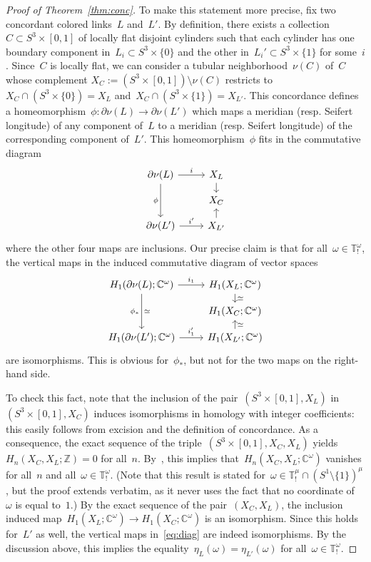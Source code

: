 \documentclass{amsart}
\newcommand{\Z}{\mathbb{Z}}
\newcommand{\C}{\mathbb{C}}
\newcommand{\T}{\mathbb{T}}
\theoremstyle{definition}
\theoremstyle{remark}
\begin{document}
\begin{proof}[Proof of Theorem~\ref{thm:conc}]
	To make this statement more precise, fix two concordant colored links~$L$ and~$L'$. By definition, there exists a collection~$C\subset S^3\times [0,1]$ of locally flat disjoint cylinders such that each cylinder has one boundary component in~$L_i\subset S^3\times\{0\}$ and the other in~$L_i'\subset S^3\times \{1\}$ for some~$i$. Since~$C$ is locally flat, we can consider a tubular neighborhood~$\nu(C)$ of~$C$ whose complement $X_C:=(S^3\times [0,1])\setminus\nu(C)$ restricts to~$X_C\cap(S^3\times\{0\})=X_L$ and~$X_C\cap(S^3\times\{1\})=X_{L'}$.
	This concordance defines a homeomorphism~$\phi\colon\partial\nu(L)\to\partial\nu(L')$ which maps a meridian
	(resp. Seifert longitude) of any component of~$L$ to a meridian
	(resp. Seifert longitude) of the corresponding component of~$L'$. This homeomorphism~$\phi$ fits in the commutative diagram
	\[
	\begin{tikzcd}[row sep=small]
		\partial\nu(L)\ar[r,"i"] \ar[dd,"\phi" '] & X_L  \ar[d]\\
		& X_C\\
		\partial\nu(L')\ar[r,"i'"] & X_{L'}  \ar[u]
	\end{tikzcd}
	\]
	where the other four maps are inclusions. Our precise claim is that for all~$\omega\in\T^\omega_!$,
	the vertical maps in the induced commutative diagram of vector spaces
	\begin{equation}
		\label{eq:diag}
		\begin{tikzcd}[row sep=small]
			H_1(\partial\nu(L);\C^\omega)\ar[r,"i_1"] \ar[dd,"\phi_*" ',"\simeq"] & H_1(X_L;\C^\omega)  \ar[d,"\simeq"]\\
			& H_1(X_C;\C^\omega)\\
			H_1(\partial\nu(L');\C^\omega)\ar[r,"i_1'"] & H_1(X_{L'};\C^\omega) \ar[u,"\simeq" ']
		\end{tikzcd}
	\end{equation}
	are isomorphisms. This is obvious for~$\phi_*$, but not for the two maps on the right-hand side.
	
	To check this fact, note that the inclusion of the pair~$(S^3\times[0,1],X_L)$ in~$(S^3\times[0,1],X_C)$ induces
	isomorphisms in homology with integer coefficients: this easily follows from excision and the definition of concordance. As a consequence,
	the exact sequence of the triple~$(S^3\times[0,1],X_C,X_L)$ yields~$H_n(X_C,X_L;\Z)=0$ for all~$n$.
	By~\cite[Lemma~2.16]{CNT}, this
	implies that~$H_n(X_C,X_L;\C^\omega)$ vanishes for all~$n$ and all~$\omega\in\T^\omega_!$.
	(Note that this result is stated for~$\omega\in\T^\mu_!\cap(S^1\setminus\{1\})^\mu$,
	but the proof extends verbatim, as it never uses the fact that no coordinate of~$\omega$ is equal to~$1$.)
	By the exact sequence
	of the pair~$(X_C,X_L)$, the inclusion induced map~$H_1(X_L;\C^\omega)\to H_1(X_C;\C^\omega)$ is an isomorphism.
	Since this holds for~$L'$ as well, the vertical maps in~\eqref{eq:diag} are indeed isomorphisms. By the discussion above,
	this implies the equality~$\eta_L(\omega)=\eta_{L'}(\omega)$ for all~$\omega\in\T^\omega_!$.
	

\end{proof}
\end{document}
